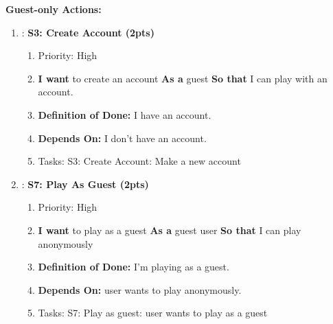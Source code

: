 \textbf{Guest-only Actions:}
\begin{enumerate}

    \item: \textbf{S3: Create Account (2pts)}
    \begin{enumerate}
        \item Priority: High
        \item \textbf{I want} to create an account \textbf{As a} guest  \textbf{So that} I can play with an account.
        \item \textbf{Definition of Done:} I have an account.
        \item \textbf{Depends On:} I don't have an account.
        \item Tasks: S3: Create Account: Make a new account
    \end{enumerate}

    \item: \textbf{S7: Play As Guest (2pts)}
    \begin{enumerate}
        \item Priority: High
        \item \textbf{I want} to play as a guest \textbf{As a} guest user \textbf{So that} I can play anonymously
        \item \textbf{Definition of Done:} I'm playing as a guest.
        \item \textbf{Depends On:} user wants to play anonymously.
        \item Tasks: S7: Play as guest: user wants to play as a guest
    \end{enumerate}
\end{enumerate}

